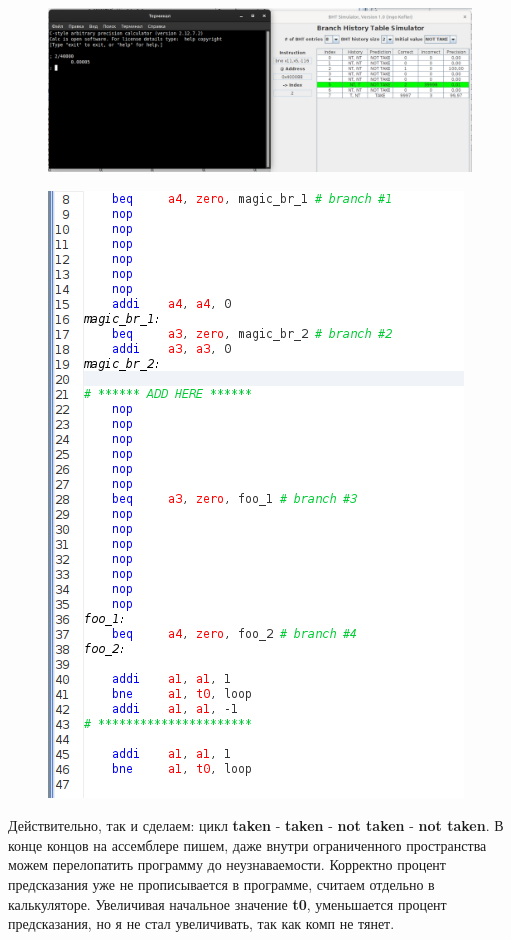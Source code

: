 \begin{enumerate}
\begin{figure}[H]
    \centering
    \includegraphics[width=0.75\linewidth]{Formal/BHT4.png}
\end{figure}
\begin{figure}[H]
    \centering
    \includegraphics[width=0.75\linewidth]{Formal/task4.png}
\end{figure}
Действительно, так и сделаем: цикл \textbf{taken} - \textbf{taken} - \textbf{not taken} - \textbf{not taken}.
В конце концов на ассемблере пишем, даже внутри ограниченного пространства можем перелопатить программу до неузнаваемости. Корректно процент предсказания уже не прописывается в программе, считаем отдельно в калькуляторе. Увеличивая начальное значение \textbf{t0}, уменьшается процент предсказания, но я не стал увеличивать, так как комп не тянет. 
\end{enumerate}

